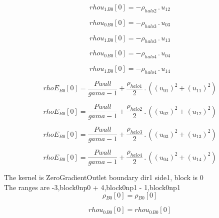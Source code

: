 \documentclass{article}
\begin{document}
\begin{dmath}{rhou_{1}{_{B0}}}[{0}] = - \rho_{halo 2} \,.\, u_{12}\end{dmath}

\begin{dmath}{rhou_{0}{_{B0}}}[{0}] = - \rho_{halo 3} \,.\, u_{03}\end{dmath}

\begin{dmath}{rhou_{1}{_{B0}}}[{0}] = - \rho_{halo 3} \,.\, u_{13}\end{dmath}

\begin{dmath}{rhou_{0}{_{B0}}}[{0}] = - \rho_{halo 4} \,.\, u_{04}\end{dmath}

\begin{dmath}{rhou_{1}{_{B0}}}[{0}] = - \rho_{halo 4} \,.\, u_{14}\end{dmath}

\begin{dmath}{rhoE{_{B0}}}[{0}] = \frac{Pwall}{gama - 1} + \frac{\rho_{halo 1}}{2} \,.\, \left(\left(u_{01} \right)^{2} + \left(u_{11} \right)^{2}\right)\end{dmath}

\begin{dmath}{rhoE{_{B0}}}[{0}] = \frac{Pwall}{gama - 1} + \frac{\rho_{halo 2}}{2} \,.\, \left(\left(u_{02} \right)^{2} + \left(u_{12} \right)^{2}\right)\end{dmath}

\begin{dmath}{rhoE{_{B0}}}[{0}] = \frac{Pwall}{gama - 1} + \frac{\rho_{halo 3}}{2} \,.\, \left(\left(u_{03} \right)^{2} + \left(u_{13} \right)^{2}\right)\end{dmath}

\begin{dmath}{rhoE{_{B0}}}[{0}] = \frac{Pwall}{gama - 1} + \frac{\rho_{halo 4}}{2} \,.\, \left(\left(u_{04} \right)^{2} + \left(u_{14} \right)^{2}\right)\end{dmath}

\noindent The kernel is ZeroGradientOutlet boundary dir1 side1, block is 0\\\noindent The ranges are -3,block0np0 + 4,block0np1 - 1,block0np1\\\begin{dmath}{\rho{_{B0}}}[{0}] = {\rho{_{B0}}}[{0}]\end{dmath}

\begin{dmath}{rhou_{0}{_{B0}}}[{0}] = {rhou_{0}{_{B0}}}[{0}]\end{dmath}
\end{document}

